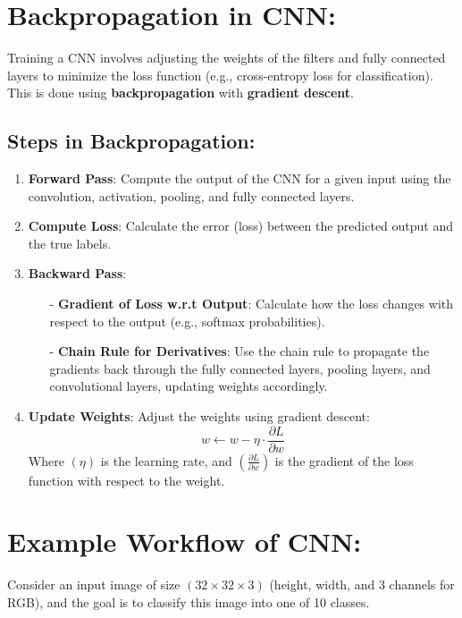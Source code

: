 \documentclass[10pt]{article}
\begin{document}
\section{ Backpropagation in CNN:}
Training a CNN involves adjusting the weights of the filters and fully connected layers to minimize the loss function (e.g., cross-entropy loss for classification). This is done using {\bf backpropagation} with {\bf gradient descent}.

\subsection{Steps in Backpropagation:}

\begin{enumerate}
   \item {\bf Forward Pass}: Compute the output of the CNN for a given input using the convolution, activation, pooling, and fully connected layers.
      
   \item {\bf Compute Loss}: Calculate the error (loss) between the predicted output and the true labels.
   
   \item {\bf Backward Pass}:
   \begin{itemize}
      \item [-] {\bf Gradient of Loss w.r.t Output}: Calculate how the loss changes with respect to the output (e.g., softmax probabilities).
      \item [-] {\bf Chain Rule for Derivatives}: Use the chain rule to propagate the gradients back through the fully connected layers, pooling layers, and convolutional layers, updating weights accordingly.
   \end{itemize}
   
   \item {\bf Update Weights}: Adjust the weights using gradient descent:
      $$
      w \leftarrow w - \eta \cdot \frac{\partial L}{\partial w}
      $$
      Where $( \eta )$ is the learning rate, and $( \frac{\partial L}{\partial w} )$ is the gradient of the loss function with respect to the weight.
\end{enumerate}

\section{ Example Workflow of CNN:}
Consider an input image of size $( 32 \times 32 \times 3 )$ (height, width, and 3 channels for RGB), and the goal is to classify this image into one of 10 classes.
\end{document}

